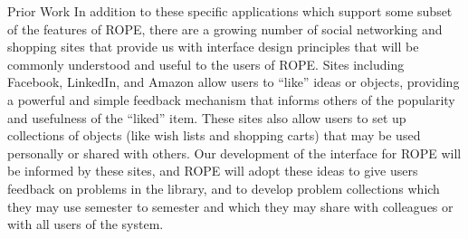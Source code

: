 \documentclass[11pt]{article}
\begin{document}
\begin{section}{Prior Work}
In addition to these specific applications which support some subset of
the features of ROPE, there are a growing number of social networking
and shopping sites that provide us with interface design principles that
will be commonly understood and useful to the users of ROPE.  Sites
including Facebook, LinkedIn, and Amazon allow users to ``like'' ideas or
objects, providing a powerful and simple feedback mechanism that informs
others of the popularity and usefulness of the ``liked'' item.  These
sites also allow users to set up collections of objects (like wish lists
and shopping carts) that may be used personally or shared with others.
Our development of the interface for ROPE will be informed by these
sites, and ROPE will adopt these ideas to give users feedback on
problems in the library, and to develop problem collections which they may
use semester to semester and which they may share with colleagues or with
all users of the system.


\end{section}
\end{document}
